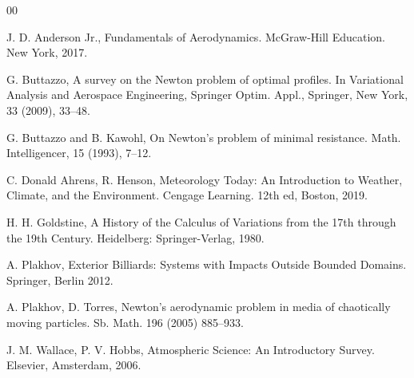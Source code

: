 \documentclass[preprint,11pt]{elsarticle}
\theoremstyle{definition}
\begin{document}

\begingroup
\small
\setlength{\parskip}{0pt}
\setlength{\itemsep}{0pt}
\setlength{\bibsep}{0pt} %



\begin{thebibliography}{00}


 J. D. Anderson Jr., Fundamentals of Aerodynamics. McGraw-Hill Education. New York, 2017.


 G. Buttazzo, A survey on the Newton problem of optimal profiles. In Variational Analysis and Aerospace Engineering, Springer Optim. Appl., Springer, New York, 33 (2009), 33--48. 


G. Buttazzo and B. Kawohl, On Newton's problem of minimal resistance. Math. Intelligencer, 15 (1993), 7--12.
 
  C. Donald Ahrens, R. Henson, Meteorology Today: An Introduction to Weather, Climate, and the Environment. Cengage Learning. 12th ed, Boston, 2019.
 
  H. H. Goldstine, A History of the Calculus of Variations from the 17th through the 19th Century. Heidelberg: Springer-Verlag, 1980.

 A.  Plakhov, Exterior Billiards: Systems with Impacts Outside Bounded Domains. Springer, Berlin 2012.

 A. Plakhov, D. Torres, Newton's aerodynamic problem in media of chaotically moving particles. Sb. Math. 196 (2005) 885--933.


  J. M. Wallace, P. V. Hobbs, Atmospheric Science: An Introductory Survey. Elsevier, Amsterdam, 2006.

\end{thebibliography}

 
\endgroup
\end{document}
